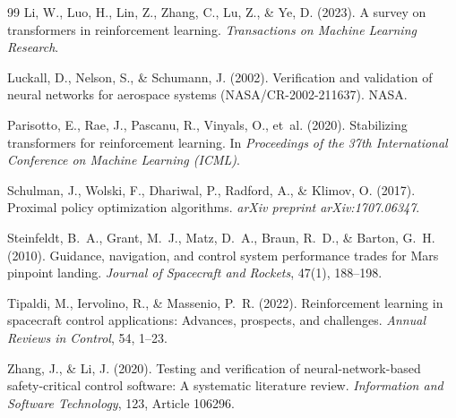 \documentclass[10pt,twocolumn]{article}
\begin{document}
\begin{thebibliography}{99}
Li, W., Luo, H., Lin, Z., Zhang, C., Lu, Z., \& Ye, D. (2023).
A survey on transformers in reinforcement learning.
\textit{Transactions on Machine Learning Research}.

Luckall, D., Nelson, S., \& Schumann, J. (2002).
Verification and validation of neural networks for aerospace systems (NASA/CR-2002-211637).
NASA.

Parisotto, E., Rae, J., Pascanu, R., Vinyals, O., et~al. (2020).
Stabilizing transformers for reinforcement learning.
In \textit{Proceedings of the 37th International Conference on Machine Learning (ICML)}.

Schulman, J., Wolski, F., Dhariwal, P., Radford, A., \& Klimov, O. (2017).
Proximal policy optimization algorithms.
\textit{arXiv preprint arXiv:1707.06347}.

Steinfeldt, B.~A., Grant, M.~J., Matz, D.~A., Braun, R.~D., \& Barton, G.~H. (2010).
Guidance, navigation, and control system performance trades for Mars pinpoint landing.
\textit{Journal of Spacecraft and Rockets}, 47(1), 188--198.

Tipaldi, M., Iervolino, R., \& Massenio, P.~R. (2022).
Reinforcement learning in spacecraft control applications: Advances, prospects, and challenges.
\textit{Annual Reviews in Control}, 54, 1--23.

Zhang, J., \& Li, J. (2020).
Testing and verification of neural-network-based safety-critical control software: A systematic literature review.
\textit{Information and Software Technology}, 123, Article 106296.

\end{thebibliography}
\end{document}
